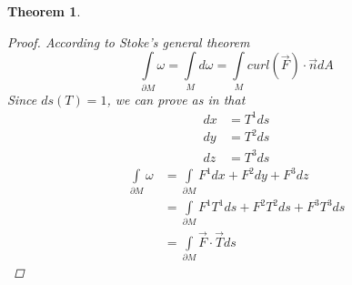 \documentclass[11pt]{article}
\newtheorem{theorem}{Theorem}[section]
\begin{document}
\begin{theorem}
\begin{proof}
According to Stoke's general theorem
\[\int\limits_{\partial M} \omega = \int\limits_{M} d\omega = \int\limits_{M} curl(\vec{F}) \cdot \vec{n} dA\]
Since $ds(T) =1$, we can prove as in that \begin{align*}
dx &= T^1 ds\\
dy &= T^2 ds\\
dz &= T^3 ds
\end{align*}
\begin{align*}
\int\limits_{\partial M} \omega &= \int\limits_{\partial M} F^1 dx + F^2 dy + F^3 dz \\
&= \int\limits_{\partial M} F^1 T^1 ds + F^2 T^2ds  + F^3 T^3 ds\\
&= \int\limits_{\partial M} \vec{F} \cdot \vec{T} ds
\end{align*}
\end{proof}
\end{theorem}
\end{document}
